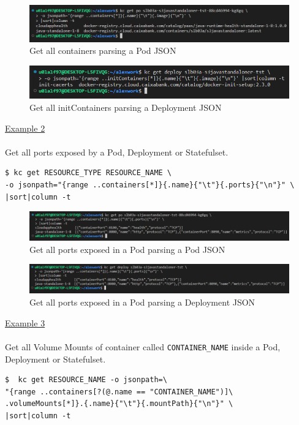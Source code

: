 \documentclass{article}
\newenvironment{codetemplate}[1][]{%
  \mybasecolorbox[#1]
  \itshape
}{%
  \endmybasecolorbox
}
\begin{document}
\begin{figure}[H]
    \centering
    \includegraphics[scale=0.5]{pictures/image18.png}
    \caption{Get all containers parsing a Pod JSON}
    \label{parsing json 1}
\end{figure}
\begin{figure}[H]
    \centering
    \includegraphics[scale=0.54]{pictures/image19.png}
    \caption{Get all initContainers parsing a Deployment JSON}
    \label{parsing json 2}
\end{figure}

\underline{Example 2} 
\\
\\
Get all ports exposed by a Pod, Deployment or Statefulset.
\begin{codetemplate}{}
\begin{verbatim}
$ kc get RESOURCE_TYPE RESOURCE_NAME \ 
-o jsonpath="{range ..containers[*]}{.name}{"\t"}{.ports}{"\n"}" \ 
|sort|column -t
\end{verbatim}
\end{codetemplate}
\begin{figure}[H]
    \centering
    \includegraphics[scale=0.4]{pictures/image20.png}
    \caption{Get all ports exposed in a Pod parsing a Pod JSON}
    \label{parsing json 3}
\end{figure}
\begin{figure}[H]
    \centering
    \includegraphics[scale=0.4]{pictures/image21.png}
    \caption{Get all ports exposed in a Pod parsing a Deployment JSON}
    \label{parsing json 4}
\end{figure}

\underline{Example 3} 
\\
\\
Get all Volume Mounts of container called \verb|CONTAINER_NAME| inside a Pod, Deployment or Statefulset.
\begin{codetemplate}{}
\begin{verbatim}
$  kc get RESOURCE_NAME -o jsonpath=\
"{range ..containers[?(@.name == "CONTAINER_NAME")]\
.volumeMounts[*]}.{.name}{"\t"}{.mountPath}{"\n"}" \
|sort|column -t
\end{verbatim}
\end{codetemplate}
\end{document}

